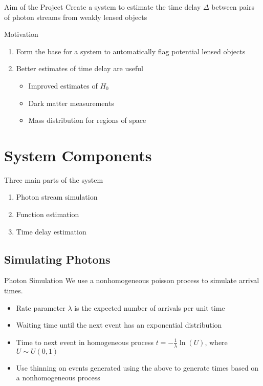 \documentclass{beamer}
\begin{document}
\begin{frame}{Aim of the Project}
  Create a system to estimate the time delay $\Delta$ between pairs of
  photon streams from weakly lensed objects
\end{frame}

\begin{frame}{Motivation}
  \begin{enumerate}
  \item<1-> Form the base for a system to automatically flag potential lensed
    objects
  \item<4-> Better estimates of time delay are useful
    \begin{itemize}
    \item<5-> Improved estimates of $H_0$
    \item<6-> Dark matter measurements
    \item<7-> Mass distribution for regions of space
    \end{itemize}
  \end{enumerate}
\end{frame}

\section{System Components}

\begin{frame}
  Three main parts of the system
  \begin{enumerate}
  \item<1-> \alert<4->{Photon stream simulation}
  \item<2-> Function estimation
  \item<3-> Time delay estimation
  \end{enumerate}
\end{frame}

\subsection{Simulating Photons}

\begin{frame}{Photon Simulation}
  We use a nonhomogeneous poisson process to simulate arrival times.
  \begin{itemize}[<+->]
  \item Rate parameter $\lambda$ is the expected number of arrivals per unit time
  \item Waiting time until the next event has an exponential distribution
  \item Time to next event in homogeneous process $t=-\frac{1}{\lambda}\ln(U)$,
    where $U\sim U(0,1)$
  \item Use thinning on events generated using the above to generate times based
    on a nonhomogeneous process
  \end{itemize}
\end{frame}
\end{document}
